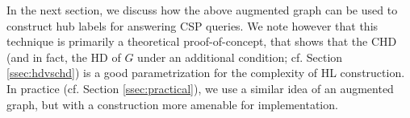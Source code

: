 In the next section, we discuss how the above augmented graph can be used to construct hub labels for answering CSP queries. We note however that this technique is primarily a theoretical proof-of-concept, that shows that the CHD (and in fact, the HD of $G$ under an additional condition; cf. Section \ref{ssec:hdvschd}) is a good parametrization for the complexity of HL construction. In practice (cf. Section \ref{ssec:practical}), we use a similar idea of an augmented graph, but with a construction more amenable for implementation.

